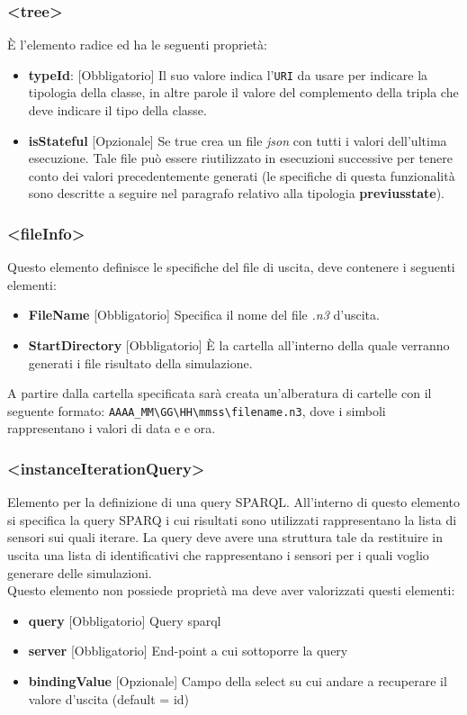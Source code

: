 \documentclass[12pt,a4paper,italian]{article}
\begin{document}
\subsubsection{\large{<tree>}}
\`E l'elemento radice ed ha le seguenti proprietà:
\begin{itemize}
	\item \textbf{typeId}: [Obbligatorio] Il suo valore indica l'\texttt{URI} da usare per indicare la tipologia della classe, in altre parole il valore del complemento della tripla 
	che deve indicare il tipo della classe.
	\item \textbf{isStateful} [Opzionale] Se true crea un file \emph{json} con tutti i valori dell'ultima esecuzione. Tale file può essere riutilizzato in esecuzioni successive per tenere conto dei valori 
	precedentemente generati (le specifiche di questa funzionalità sono descritte a seguire nel paragrafo relativo alla tipologia \textbf{previusstate}). 
\end{itemize}
\subsubsection{\large{<fileInfo>}}
Questo elemento definisce le specifiche del file di uscita, deve contenere i seguenti elementi:
\begin{itemize}
	\item \textbf{FileName} [Obbligatorio] Specifica il nome del file \emph{.n3} d'uscita.
	\item \textbf{StartDirectory} [Obbligatorio] \`E la cartella all'interno della quale verranno generati i file risultato della simulazione.
\end{itemize}
A partire dalla cartella specificata sarà creata un'alberatura di cartelle con il seguente formato: \texttt{AAAA\_MM\textbackslash GG\textbackslash HH\textbackslash mmss\textbackslash filename.n3}, dove i simboli rappresentano i valori di data e e ora.
\subsubsection{\large{<instanceIterationQuery>}}
Elemento per la definizione di una query SPARQL. All'interno di questo elemento si specifica la query SPARQ i cui risultati sono utilizzati rappresentano la lista di sensori sui quali iterare.
La query deve avere una struttura tale da restituire in uscita una lista di identificativi che rappresentano i sensori per i quali voglio generare delle simulazioni.\\
Questo elemento non possiede proprietà ma deve aver valorizzati questi elementi:
\begin{itemize}
	\item \textbf{query} [Obbligatorio] Query sparql
	\item \textbf{server} [Obbligatorio] End-point a cui sottoporre la query
	\item \textbf{bindingValue} [Opzionale] Campo della select su cui andare a recuperare il valore d'uscita (default = id)
\end{itemize}
\end{document}

